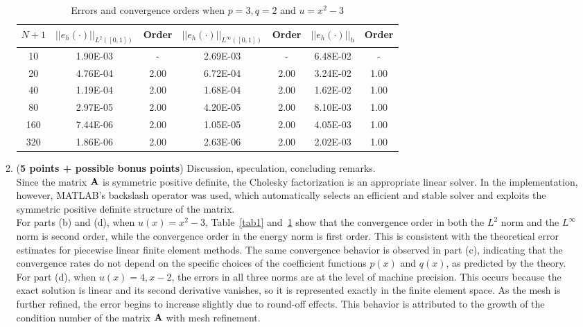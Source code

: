 \documentclass[11pt]{article}      %
\begin{document}
\begin{enumerate}
\begin{enumerate}
\begin{table}[!h]
\caption{Errors and convergence orders when $p=3, q=2$ and $u=x^2-3$}
\vspace{0.1in}
\centering
\begin{tabular}{|c|c|c| c| c| c| c|}
	\hline
	$N+1$&  $||e_h(\cdot)||_{L^2([0,1])}$ & Order  & $||e_h(\cdot)||_{L^\infty([0,1])}$ & Order& $||e_h(\cdot)||_h$& Order \\
	\hline
	10  & 1.90E-03 & -    & 2.69E-03 & -    & 6.48E-02 & - \\
	20  & 4.76E-04 & 2.00 & 6.72E-04 & 2.00 & 3.24E-02 & 1.00 \\
	40  & 1.19E-04 & 2.00 & 1.68E-04 & 2.00 & 1.62E-02 & 1.00 \\
	80  & 2.97E-05 & 2.00 & 4.20E-05 & 2.00 & 8.10E-03 & 1.00 \\
	160 & 7.44E-06 & 2.00 & 1.05E-05 & 2.00 & 4.05E-03 & 1.00 \\
	320 & 1.86E-06 & 2.00 & 2.63E-06 & 2.00 & 2.02E-03 & 1.00 \\
	\hline
\end{tabular}
\label{tab5}
\end{table}
\clearpage
\item ({\bf 5 points + possible bonus points})
Discussion, speculation, concluding remarks.\\
Since the  matrix ${\bf A}$ is symmetric positive definite, the Cholesky factorization is an appropriate linear solver. In the implementation, however, MATLAB’s backslash operator was used, which automatically selects an efficient and stable solver and exploits the symmetric positive definite structure of the matrix.\\

For parts (b) and (d), when $u(x) = x^2 - 3$, Table~\ref{tab1} and~\ref{tab5} show that the convergence order in both the $L^2$ norm and the $L^\infty$ norm is second order, while the convergence order in the energy norm is first order. This is consistent with the theoretical error estimates for piecewise linear finite element methods. The same convergence behavior is observed in part (c), indicating that the convergence rates do not depend on the specific choices of the coefficient functions $p(x)$ and $q(x)$, as predicted by the theory.\\

For part (d), when $u(x) = 4, x - 2$, the errors in all three norms are at the level of machine precision. This occurs because the exact solution is linear and its second derivative vanishes, so it is represented exactly in the finite element space. As the mesh is further refined, the error begins to increase slightly due to round-off effects. This behavior is attributed to the growth of the condition number of the  matrix ${\bf A}$ with mesh refinement.

\end{enumerate}

\end{enumerate}
\end{document}
